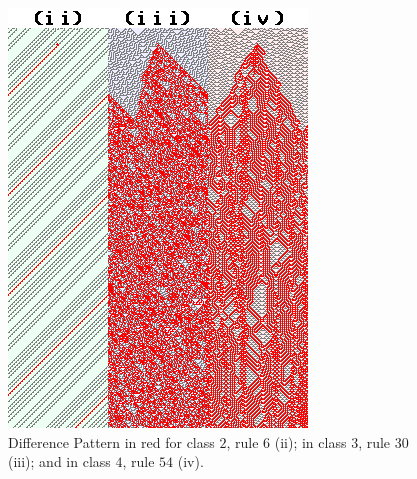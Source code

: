 \begin{figure}
    \centering
    \includegraphics[width=\linewidth]{Images/P4/4classesDiffPatt.png}
    \caption{Difference Pattern in red for class $2$, rule $6$ (ii); in class $3$, rule $30$ (iii); and in class $4$, rule $54$ (iv).}
    \label{fig:4classDiffPatt}
\end{figure}







\clearpage



